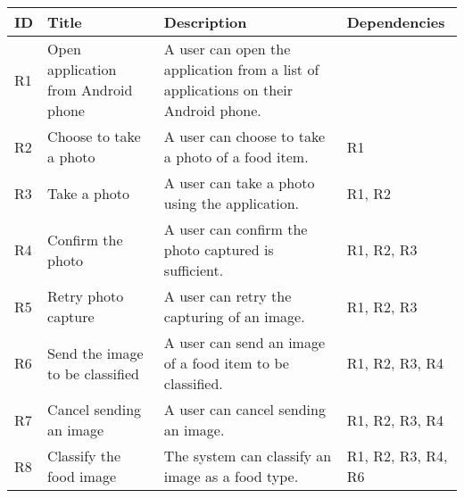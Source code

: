 \begin{longtable}{|p{.75cm}|p{3.5cm}|p{6cm}|p{2.5cm}|}
\hline
\textbf{ID} & \textbf{Title}                                              & \textbf{Description}                                                                                    & Dependencies                                   \\ \hline
R1          & Open application from Android phone                         & A user can open the application from a list of applications on their Android phone.                     &                                                \\ \hline
R2          & Choose to take a photo                                      & A user can choose to take a photo of a food item.                                                       & R1                                             \\ \hline
R3          & Take a photo                                                & A user can take a photo using the application.                                                          & R1, R2                                         \\ \hline
R4          & Confirm the photo                                           & A user can confirm the photo captured is sufficient.                                                    & R1, R2, R3                                     \\ \hline
R5          & Retry photo capture                                         & A user can retry the capturing of an image.                                                             & R1, R2, R3                                     \\ \hline
R6          & Send the image to be classified                             & A user can send an image of a food item to be classified.                                               & R1, R2, R3, R4                                 \\ \hline
R7          & Cancel sending an image                                     & A user can cancel sending an image.                                                                    & R1, R2, R3, R4                                 \\ \hline
R8          & Classify the food image                                     & The system can classify an image as a food type.                                                        & R1, R2, R3, R4, R6                             \\ \hline

\end{longtable}

